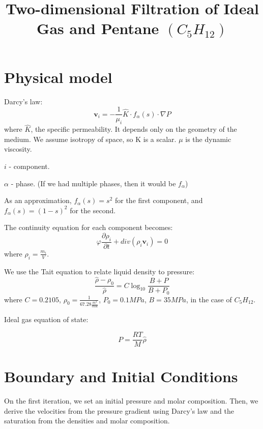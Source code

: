 \documentclass[a4paper,12pt]{article}
\author{}
\date{}
\title{Two-dimensional Filtration of Ideal Gas and Pentane
\(\left( C_5 H_{12} \right) \)}
\begin{document}
\maketitle

\section{Physical model}

Darcy's law:
\begin{equation}
    \bm{v}_i = -\frac{1}{\mu_i} \hat K \cdot f_\alpha (s)
    \cdot \nabla P
\end{equation}
where \(\hat K\), the specific permeability.
It depends only on the geometry of the medium.
We assume isotropy of space, so K is a scalar.
\(\mu\) is the dynamic viscosity.

\(i\) - component.

\(\alpha\) - phase. (If we had multiple phases, then
it would be \(f_\alpha\))

As an approximation, \(f_\alpha (s) = s^2\) for the first 
component, and \(f_\alpha (s) = (1 - s)^2\) for the second.

The continuity equation for each component becomes:
\begin{equation}
    \varphi \frac{\partial \rho_i}{\partial t}
    + div (\rho_i \bm{v}_i) = 0
\end{equation}
where \(\rho_i = \frac{m_i}{V}\).

We use the Tait equation to relate liquid density to pressure:
\begin{equation}
    \frac{\hat{\rho} - \rho_0}{\hat{\rho}} = C \log_{10}
    \frac{B + P}{B + P_0}
\end{equation}
where \(C = 0.2105\),
\(\rho_0 = \frac{1}{67.28 \frac{m^3}{mol}}\),
\(P_0 = 0.1 MPa\), \(B = 35MPa\),
in the case of \(C_5H_{12}\).

Ideal gas equation of state:

\begin{equation}
    P = \frac{RT}{M} \hat{\rho}
\end{equation}

\section{Boundary and Initial Conditions}

On the first iteration, we set an initial
pressure and molar composition.
Then, we derive the velocities from the 
pressure gradient using Darcy's law and the
saturation from the densities
and molar composition.
\end{document}
